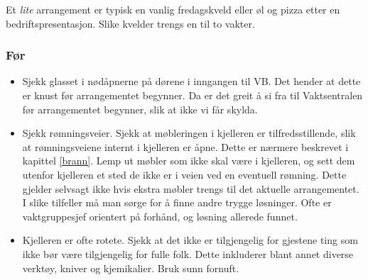 \documentclass[11pt,norsk,a4paper]{article}
\begin{document}
Et \textit{lite} arrangement er typisk en vanlig fredagskveld eller øl og pizza etter en bedriftspresentasjon. Slike kvelder trengs en til to vakter.

\subsubsection{Før}
\begin{itemize}
\item Sjekk glasset i nødåpnerne på dørene i inngangen til VB. Det hender at dette er knust før arrangementet begynner. Da er det greit å si fra til Vaktsentralen før arrangementet begynner, slik at ikke vi får skylda.
\item Sjekk rømningsveier. Sjekk at møbleringen i kjelleren er tilfredsstillende, slik at rømningsveiene internt i kjelleren er åpne. Dette er nærmere beskrevet i kapittel \vref{brann}. Lemp ut møbler som ikke skal være i kjelleren, og sett dem utenfor kjelleren et sted de ikke er i veien ved en eventuell rømning. Dette gjelder selvsagt ikke hvis ekstra møbler trengs til det aktuelle arrangementet. I slike tilfeller må man sørge for å finne andre trygge løsninger. Ofte er vaktgruppesjef orientert på forhånd, og løsning allerede funnet.
\item Kjelleren er ofte rotete. Sjekk at det ikke er tilgjengelig for gjestene ting som ikke bør være tilgjengelig for fulle folk. Dette inkluderer blant annet diverse verktøy, kniver og kjemikalier. Bruk sunn fornuft.
\end{itemize}
\end{document}
